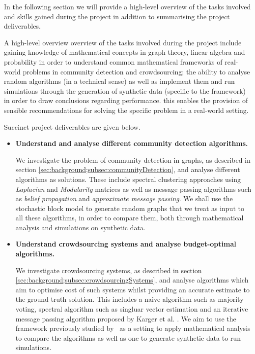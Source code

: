 \documentclass[12pt]{article}
\numberwithin{equation}{section}
\begin{document}
In the following section we will provide a high-level overview of the tasks involved and skills gained during the project in addition to summarising the project deliverables.

A high-level overview overview of the tasks involved during the project include gaining knowledge of mathematical concepts in graph theory, linear algebra and probability in order to understand common mathematical frameworks of real-world problems in community detection and crowdsourcing; the ability to analyse random algorithms (in a technical sense) as well as implement them and run simulations through the generation of synthetic data (specific to the framework) in order to draw conclusions regarding performance. this enables the provision of sensible recommendations for solving the specific problem in a real-world setting.

Succinct project deliverables are given below.
\begin{itemize}
	\item \textbf{Understand and analyse different community detection algorithms.}

	We investigate the problem of community detection in graphs, as described in section \ref{sec:background;subsec:communityDetection}, and analyse different algorithms as solutions. These include spectral clustering approaches using \textsl{Laplacian} and \textsl{Modularity} matrices as well as message passing algorithms such as \textsl{belief propagation} and \textsl{approximate message passing}. We shall use the stochastic block model to generate random graphs that we treat as input to all these algorithms, in order to compare them, both through mathematical analysis and simulations on synthetic data.

	\item \textbf{Understand crowdsourcing systems and analyse budget-optimal algorithms.}

	We investigate crowdsourcing systems, as described in section \ref{sec:background;subsec:crowdsourcingSystems}, and analyse algorithms which aim to optimise cost of such systems whilst providing an accurate estimate to the ground-truth solution. This includes a naive algorithm such as majority voting, spectral algorithm such as singluar vector estimation and an iterative message passing algorithm proposed by Karger et al. \cite{KOS13}. We aim to use the framework previously studied by~\cite{KOS13} as a setting to apply mathematical analysis to compare the algorithms as well as one to generate synthetic data to run simulations.
\end{itemize}
\end{document}
